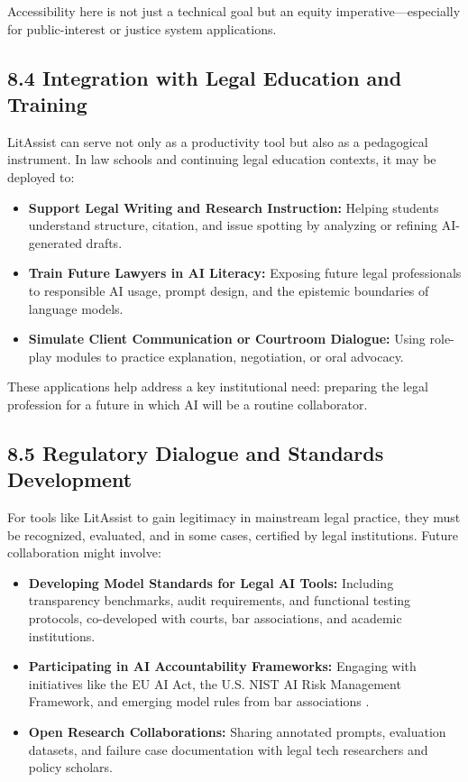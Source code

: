 \documentclass[12pt,a4paper]{article}
\begin{document}
Accessibility here is not just a technical goal but an equity imperative—especially for public-interest or justice system applications.

\subsection*{8.4 Integration with Legal Education and Training}

LitAssist can serve not only as a productivity tool but also as a pedagogical instrument. In law schools and continuing legal education contexts, it may be deployed to:

\begin{itemize}
\item \textbf{Support Legal Writing and Research Instruction:} Helping students understand structure, citation, and issue spotting by analyzing or refining AI-generated drafts.

\item \textbf{Train Future Lawyers in AI Literacy:} Exposing future legal professionals to responsible AI usage, prompt design, and the epistemic boundaries of language models.

\item \textbf{Simulate Client Communication or Courtroom Dialogue:} Using role-play modules to practice explanation, negotiation, or oral advocacy.
\end{itemize}

These applications help address a key institutional need: preparing the legal profession for a future in which AI will be a routine collaborator.

\subsection*{8.5 Regulatory Dialogue and Standards Development}

For tools like LitAssist to gain legitimacy in mainstream legal practice, they must be recognized, evaluated, and in some cases, certified by legal institutions. Future collaboration might involve:

\begin{itemize}
\item \textbf{Developing Model Standards for Legal AI Tools:} Including transparency benchmarks, audit requirements, and functional testing protocols, co-developed with courts, bar associations, and academic institutions.

\item \textbf{Participating in AI Accountability Frameworks:} Engaging with initiatives like the EU AI Act, the U.S. NIST AI Risk Management Framework, and emerging model rules from bar associations \cite{Floridi2022}.

\item \textbf{Open Research Collaborations:} Sharing annotated prompts, evaluation datasets, and failure case documentation with legal tech researchers and policy scholars.
\end{itemize}
\end{document}
